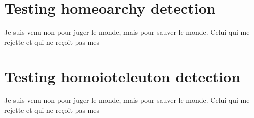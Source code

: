 \documentclass{article}
\begin{document}
\section{Testing homeoarchy detection}
\begin{minipage}{1.7in}
Je suis venu non pour juger le monde, mais pour sauver le monde. Celui qui me rejette
et qui ne re\c coit pas mes
\end{minipage}

\section{Testing homoioteleuton detection}
\begin{minipage}{1.7in}
\parindent=2cm
\indent Je suis venu non pour juger le monde, mais pour sauver le monde. Celui qui me rejette
et qui ne re\c coit pas mes
\end{minipage}
\end{document}
